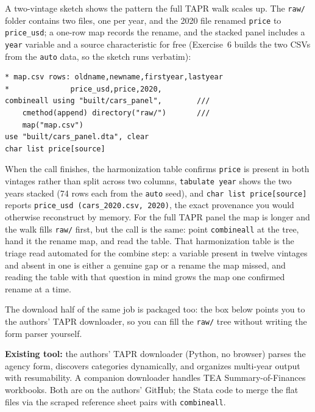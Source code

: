 \documentclass[
    a4paper,
    fontsize=10pt,
    twoside=true,
    numbers=noenddot,
]{kaobook}
\begin{document}
A two-vintage sketch shows the pattern the full TAPR walk scales up. The \texttt{raw/} folder contains two files, one per year, and the 2020 file renamed \texttt{price} to \texttt{price\_usd}; a one-row map records the rename, and the stacked panel includes a \texttt{year} variable and a source characteristic for free (Exercise~6 builds the two CSVs from the \texttt{auto} data, so the sketch runs verbatim):
\par
{\footnotesize
\begin{verbatim}
* map.csv rows: oldname,newname,firstyear,lastyear
*              price_usd,price,2020,
combineall using "built/cars_panel",        ///
    cmethod(append) directory("raw/")       ///
    map("map.csv")
use "built/cars_panel.dta", clear
char list price[source]
\end{verbatim}
}
When the call finishes, the harmonization table confirms \texttt{price} is present in both vintages rather than split across two columns, \texttt{tabulate year} shows the two years stacked (74 rows each from the \texttt{auto} seed), and \texttt{char list price[source]} reports \texttt{price\_usd (cars\_2020.csv, 2020)}, the exact provenance you would otherwise reconstruct by memory. For the full TAPR panel the map is longer and the walk fills \texttt{raw/} first, but the call is the same: point \texttt{combineall} at the tree, hand it the rename map, and read the table. That harmonization table is the triage read automated for the combine step: a variable present in twelve vintages and absent in one is either a genuine gap or a rename the map missed, and reading the table with that question in mind grows the map one confirmed rename at a time.

The download half of the same job is packaged too: the box below points you to the authors' TAPR downloader, so you can fill the \texttt{raw/} tree without writing the form parser yourself.

\begin{kaobox}[frametitle=Package Integration: \texttt{TEA-TAPR-download}]
\textbf{Existing tool:} the authors' TAPR downloader (Python, no browser) parses the agency form, discovers categories dynamically, and organizes multi-year output with resumability. A companion downloader handles TEA Summary-of-Finances workbooks. Both are on the authors' GitHub; the Stata code to merge the flat files via the scraped reference sheet pairs with \texttt{combineall}.
\end{kaobox}

\end{document}
